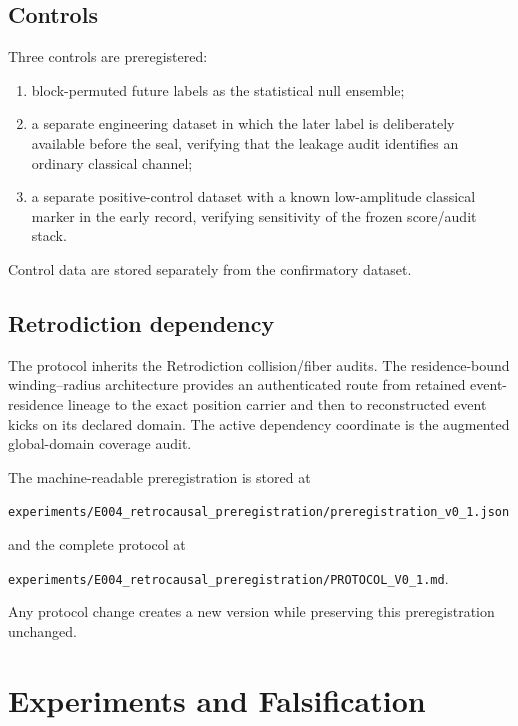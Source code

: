 \section{Controls}

Three controls are preregistered:

\begin{enumerate}
\item block-permuted future labels as the statistical null ensemble;
\item a separate engineering dataset in which the later label is deliberately available before the seal, verifying that the leakage audit identifies an ordinary classical channel;
\item a separate positive-control dataset with a known low-amplitude classical marker in the early record, verifying sensitivity of the frozen score/audit stack.
\end{enumerate}

Control data are stored separately from the confirmatory dataset.

\section{Retrodiction dependency}

The protocol inherits the Retrodiction collision/fiber audits. The residence-bound winding--radius architecture provides an authenticated route from retained event-residence lineage to the exact position carrier and then to reconstructed event kicks on its declared domain. The active dependency coordinate is the augmented global-domain coverage audit.

The machine-readable preregistration is stored at
\begin{center}
\texttt{experiments/E004\_retrocausal\_preregistration/preregistration\_v0\_1.json}
\end{center}
and the complete protocol at
\begin{center}
\texttt{experiments/E004\_retrocausal\_preregistration/PROTOCOL\_V0\_1.md}.
\end{center}

Any protocol change creates a new version while preserving this preregistration unchanged.


\chapter{Experiments and Falsification}

